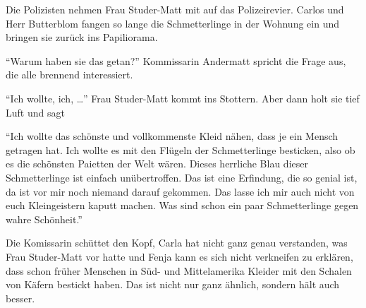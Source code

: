 Die Polizisten nehmen Frau Studer-Matt mit auf das Polizeirevier. Carlos und Herr Butterblom fangen so lange die Schmetterlinge in der Wohnung ein und bringen sie zurück ins Papiliorama. 

\enquote{Warum haben sie das getan?} Kommissarin Andermatt spricht die Frage aus, die alle brennend interessiert.

\enquote{Ich wollte, ich, \dots} Frau Studer-Matt kommt ins Stottern. Aber dann holt sie tief Luft und sagt 

\enquote{Ich wollte das schönste und vollkommenste Kleid nähen, dass je ein Mensch getragen hat. Ich wollte es mit den Flügeln der Schmetterlinge besticken, also ob es die schönsten Paietten der Welt wären. Dieses herrliche Blau dieser Schmetterlinge ist einfach unübertroffen. Das ist eine Erfindung, die so genial ist, da ist vor mir noch niemand darauf gekommen. Das lasse ich mir auch nicht von euch Kleingeistern kaputt machen. Was sind schon ein paar Schmetterlinge gegen wahre Schönheit.}

Die Komissarin schüttet den Kopf, Carla hat nicht ganz genau verstanden, was Frau Studer-Matt vor hatte und Fenja kann es sich nicht verkneifen zu erklären, dass schon früher Menschen in Süd- und Mittelamerika Kleider mit den Schalen von Käfern bestickt haben. Das ist nicht nur ganz ähnlich, sondern hält auch besser. \hfill {\color{red}\decofourleft}

